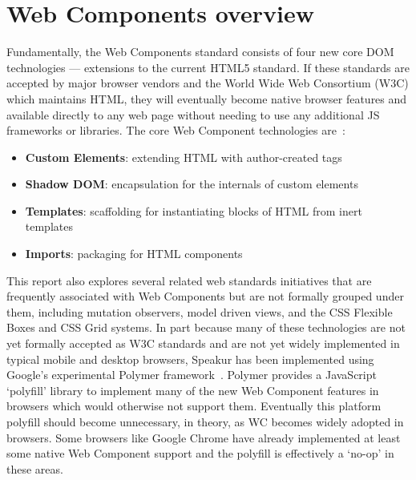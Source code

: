 \section{Web Components overview}
Fundamentally, the Web Components standard consists of four new core DOM technologies --- extensions to the current HTML5 standard.
If these standards are accepted by major browser vendors and the World Wide Web Consortium (W3C)
which maintains HTML, 
they will eventually become native browser features and available directly to any web page without needing to use any additional JS frameworks or libraries. 
The core Web Component technologies are~\cite{penades2015}:
\begin{itemize}
\item
\textbf{Custom Elements}: extending HTML with author-created tags
\item
\textbf{Shadow DOM}: encapsulation for the internals of custom elements
\item
\textbf{Templates}: scaffolding for instantiating blocks of HTML from inert templates
\item
\textbf{Imports}: packaging for HTML components
\end{itemize}

This report also explores several related web standards initiatives that are frequently associated with Web Components 
but are not formally grouped under them, including mutation observers,
model driven views, 
and the CSS Flexible Boxes
and CSS Grid
systems. 
In part because many of these technologies are not yet formally accepted as W3C standards and are not yet widely implemented in typical mobile and desktop browsers, 
Speakur has been implemented using Google's experimental Polymer framework~\cite{polymercontributors2015}.
Polymer provides a JavaScript `polyfill'
library to implement many of the new Web Component features in browsers which would otherwise not support them. 
Eventually this platform polyfill should become unnecessary, in theory, as WC becomes widely adopted in browsers.
Some browsers like Google Chrome 
have already implemented at least some native 
Web Component support 
and the polyfill is effectively a `no-op' in these areas.


